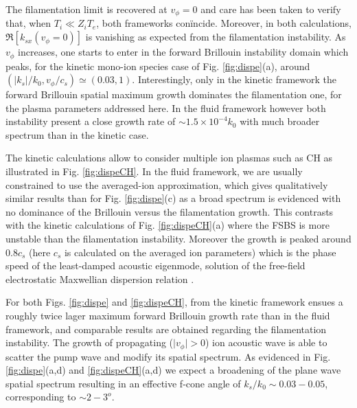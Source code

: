 \documentclass[
 reprint,
 amsmath,amssymb,
 aps,
]{revtex4-1}
\begin{document}
The filamentation limit is recovered at $v_\phi=0$ and care has been taken to verify that, when $T_i\ll Z_iT_e$, both frameworks con\"incide. Moreover, in both calculations, $\Re[k_{sx}(v_\phi=0)]$ is vanishing as expected from the filamentation instability. As $v_\phi$ increases, one starts to enter in the forward Brillouin instability domain which peaks, for the kinetic  mono-ion species case of Fig. \ref{fig:dispe}(a), around $(\vert k_s\vert/k_0, v_\phi/c_s) \simeq(0.03,1)$. Interestingly, only in the kinetic framework  the forward Brillouin spatial maximum  growth dominates the filamentation one, for the plasma parameters addressed here. In the fluid framework however both instability present a close  growth rate of $\sim 1.5\times 10^{-4} k_0$  with much  broader  spectrum than in the kinetic case.

The kinetic calculations allow to consider multiple ion plasmas such as CH as illustrated in Fig. \ref{fig:dispeCH}. In the fluid framework, we are usually constrained to use the averaged-ion approximation, which gives qualitatively similar results than for Fig. \ref{fig:dispe}(c) as a broad spectrum is evidenced with no dominance of the Brillouin versus the filamentation growth. This contrasts with the kinetic calculations of Fig. \ref{fig:dispeCH}(a) where the FSBS is more unstable than the filamentation instability. Moreover the growth is  peaked around $0.8c_s$ (here $c_s$ is calculated on the averaged ion parameters) which is the phase speed of the least-damped acoustic eigenmode, solution of the free-field electrostatic Maxwellian dispersion relation \cite[]{POF_Fried_71,POP_Williams_95}. 

For both Figs. \ref{fig:dispe} and \ref{fig:dispeCH},   from the kinetic framework ensues a  roughly twice lager maximum forward Brillouin growth rate than in the fluid framework,  and comparable results are obtained regarding the filamentation instability. 
The growth of propagating ($\vert v_\phi\vert >0$) ion acoustic wave   is able to  scatter the pump wave and modify its spatial spectrum. As evidenced in Fig. \ref{fig:dispe}(a,d) and \ref{fig:dispeCH}(a,d) we expect a broadening of the plane wave spatial spectrum  resulting in an effective  f-cone   angle  of $k_s/k_0\sim 0.03-0.05$, corresponding to $\sim 2-3^o$.  
\end{document}
